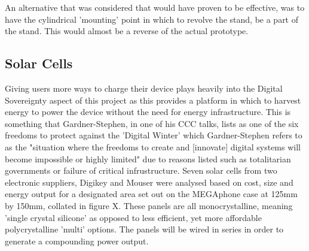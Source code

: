 An alternative that was considered that would have proven to be effective, was to have the cylindrical 'mounting' point in which to revolve the stand, be a part of the stand.
This would almost be a reverse of the actual prototype.


\subsection{Solar Cells}

Giving users more ways to charge their device plays heavily into the Digital Sovereignty aspect of this project as this provides a platform in which to harvest energy to power the device without the need for energy infrastructure.
This is something that Gardner-Stephen, in one of his CCC talks, lists as one of the six freedoms to protect against the 'Digital Winter' which Gardner-Stephen refers to as the "situation where the freedoms to create and [innovate] digital systems will become impossible or highly limited" due to reasons listed such as totalitarian governments or failure of critical infrustructure\cite{freedoms}.
Seven solar cells from two electronic suppliers, Digikey and Mouser were analysed based on cost, size and energy output for a designated area set out on the MEGAphone case at 125mm by 150mm, collated in figure X. %
These panels are all monocrystalline, meaning 'single crystal silicone' as opposed to less efficient, yet more affordable polycrystalline 'multi' options.
The panels will be wired in series in order to generate a compounding power output.

